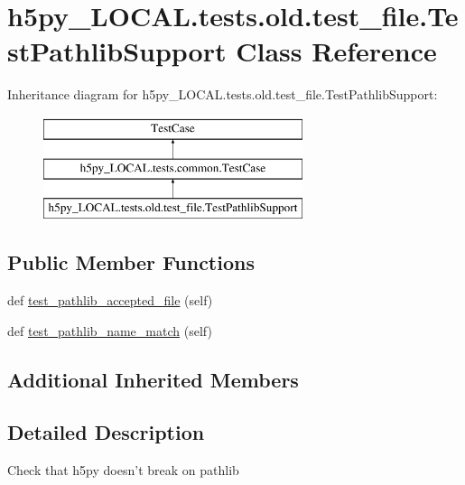 \hypertarget{classh5py__LOCAL_1_1tests_1_1old_1_1test__file_1_1TestPathlibSupport}{}\section{h5py\+\_\+\+L\+O\+C\+A\+L.\+tests.\+old.\+test\+\_\+file.\+Test\+Pathlib\+Support Class Reference}
\label{classh5py__LOCAL_1_1tests_1_1old_1_1test__file_1_1TestPathlibSupport}
Inheritance diagram for h5py\+\_\+\+L\+O\+C\+A\+L.\+tests.\+old.\+test\+\_\+file.\+Test\+Pathlib\+Support\+:\begin{figure}[H]
\begin{center}
\leavevmode
\includegraphics[height=3.000000cm]{classh5py__LOCAL_1_1tests_1_1old_1_1test__file_1_1TestPathlibSupport}
\end{center}
\end{figure}
\subsection*{Public Member Functions}
\begin{DoxyCompactItemize}
\item 
def \hyperlink{classh5py__LOCAL_1_1tests_1_1old_1_1test__file_1_1TestPathlibSupport_a7b23538b4841f747c726a31599334312}{test\+\_\+pathlib\+\_\+accepted\+\_\+file} (self)
\item 
def \hyperlink{classh5py__LOCAL_1_1tests_1_1old_1_1test__file_1_1TestPathlibSupport_a153f3550891d46d3087bfec0c133faf6}{test\+\_\+pathlib\+\_\+name\+\_\+match} (self)
\end{DoxyCompactItemize}
\subsection*{Additional Inherited Members}


\subsection{Detailed Description}
\begin{DoxyVerb}    Check that h5py doesn't break on pathlib
\end{DoxyVerb}
 


